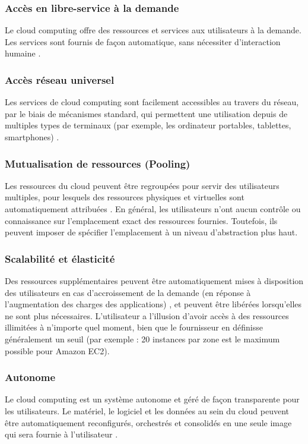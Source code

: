     \subsubsection{Accès en libre-service à la demande}
     Le cloud computing offre des ressources et services aux utilisateurs à la demande. Les services sont fournis de façon automatique, sans nécessiter d’interaction humaine \parencite{Mell}. 
    \subsubsection{Accès réseau universel}
      Les services de cloud computing  sont facilement accessibles au travers du réseau, par le biais de mécanismes standard, qui permettent une utilisation depuis de multiples types de terminaux (par exemple, les ordinateur portables, tablettes, smartphones) \parencite{Mell}. 
\subsubsection{Mutualisation de ressources (Pooling)}
 Les ressources du cloud peuvent être regroupées pour servir des utilisateurs multiples, pour lesquels des ressources physiques et virtuelles sont automatiquement attribuées \parencite{Mell}. En général, les utilisateurs n’ont aucun contrôle ou connaissance sur l’emplacement exact des ressources fournies. Toutefois, ils peuvent imposer de spécifier l’emplacement à un niveau d’abstraction plus haut.
   \subsubsection{Scalabilité et élasticité} 
   Des ressources supplémentaires peuvent être automatiquement mises à disposition des utilisateurs en cas d’accroissement de la demande (en réponse à l'augmentation des charges des applications) \parencite{Geelan}, et peuvent être libérées lorsqu’elles ne sont plus nécessaires. L’utilisateur a l’illusion d’avoir accès à des ressources illimitées à n'importe quel moment, bien que le fournisseur en définisse généralement un seuil (par exemple : 20 instances par zone est le maximum possible pour Amazon EC2).
   \subsubsection{Autonome}
    Le cloud computing  est un système autonome et géré de façon transparente pour les utilisateurs. Le matériel, le logiciel et les données au sein du cloud peuvent être 
    	automatiquement reconfigurés, orchestrés et consolidés en une seule image qui sera fournie à l’utilisateur \parencite{Wang2008}.
